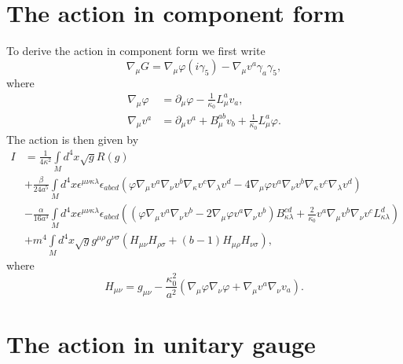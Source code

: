 \documentclass[a4paper,12pt]{article}
\begin{document}
\section{The action in component form}

To derive the action in component form we first write%
\[
\nabla_{\mu}G=\nabla_{\mu}\varphi\left(  i\gamma_{5}\right)  -\nabla_{\mu
}v^{a}\gamma_{a}\gamma_{5},
\]
where
\begin{align*}
\nabla_{\mu}\varphi &  =\partial_{\mu}\varphi-\frac{1}{\kappa_{0}}L_{\mu}%
^{a}v_{a},\\
\nabla_{\mu}v^{a}  &  =\partial_{\mu}v^{a}+B_{\mu}^{ab}v_{b}+\frac{1}%
{\kappa_{0}}L_{\mu}^{a}\varphi.
\end{align*}
The action is then given by%
\begin{align*}
I  &  =\frac{1}{4\kappa^{2}}\int\limits_{M}d^{4}x\sqrt{g}R\left(  g\right) \\
&  +\frac{\beta}{24a^{5}}\int\limits_{M}d^{4}x\epsilon^{\mu\nu\kappa\lambda
}\epsilon_{abcd}\left(  \varphi\nabla_{\mu}v^{a}\nabla_{\nu}v^{b}%
\nabla_{\kappa}v^{c}\nabla_{\lambda}v^{d}-4\nabla_{\mu}\varphi v^{a}%
\nabla_{\nu}v^{b}\nabla_{\kappa}v^{c}\nabla_{\lambda}v^{d}\right) \\
&  -\frac{\alpha}{16a^{3}}\int\limits_{M}d^{4}x\epsilon^{\mu\nu\kappa\lambda
}\epsilon_{abcd}\left(  \left(  \varphi\nabla_{\mu}v^{a}\nabla_{\nu}%
v^{b}-2\nabla_{\mu}\varphi v^{a}\nabla_{\nu}v^{b}\right)  B_{\kappa\lambda
}^{cd}+\frac{2}{\kappa_{0}}v^{a}\nabla_{\mu}v^{b}\nabla_{\nu}v^{c}%
L_{\kappa\lambda}^{d}\right) \\
&  +m^{4}\int\limits_{M}d^{4}x\sqrt{g}g^{\mu\rho}g^{\nu\sigma}\left(
H_{\mu\nu}H_{\rho\sigma}+\left(  b-1\right)  H_{\mu\rho}H_{\nu\sigma}\right)
,
\end{align*}
where
\[
H_{\mu\nu}=g_{\mu\nu}-\frac{\kappa_{0}^{2}}{a^{2}}\left(  \nabla_{\mu}%
\varphi\nabla_{\nu}\varphi+\nabla_{\mu}v^{a}\nabla_{\nu}v_{a}\right)  .
\]

\section{The action in unitary gauge}
\end{document}
